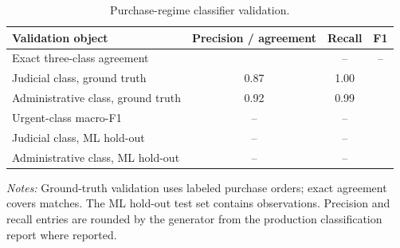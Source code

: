 \begin{table}[ht]
\centering
\caption{Purchase-regime classifier validation.}
\label{tab:classifier_validation_v9}
\begin{threeparttable}
\begin{tabular}{lccc}
\toprule
Validation object & Precision / agreement & Recall & F1 \\
\midrule
Exact three-class agreement & \BPregexExactMatchPct{} & -- & -- \\
Judicial class, ground truth & 0.87 & 1.00 & \BPregexFoneJud{} \\
Administrative class, ground truth & 0.92 & 0.99 & \BPregexFoneAdm{} \\
Urgent-class macro-F1 & -- & -- & \BPregexFone{} \\
Judicial class, ML hold-out & -- & -- & \BPregexFoneJudHO{} \\
Administrative class, ML hold-out & -- & -- & \BPregexFoneAdmHO{} \\
\bottomrule
\end{tabular}
\begin{tablenotes}[flushleft]\footnotesize
\item \textit{Notes:} Ground-truth validation uses \BPregexNGroundTruth{} labeled purchase orders; exact agreement covers \BPregexExactMatchN{} matches. The ML hold-out test set contains \BPregexNHO{} observations. Precision and recall entries are rounded by the generator from the production classification report where reported.
\end{tablenotes}
\end{threeparttable}
\end{table}
